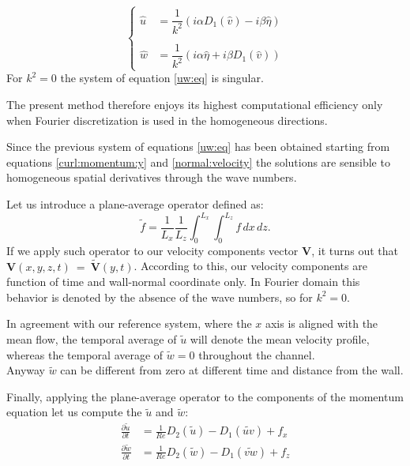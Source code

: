 \begin{equation}
\begin{cases}
\label{uw:eq}
\hat{u} &= \dfrac{1}{k^{2}} ( i \alpha D_{1}(\hat{v} ) - i \beta \hat{\eta})\\\\
\hat{w} &= \dfrac{1}{k^{2}} (i \alpha \hat{\eta} + i \beta D_{1}(\hat{v}))
\end{cases}
\end{equation}
For $k^{2}=0$ the system of equation \eqref{uw:eq} is singular. \par
The present method therefore enjoys its highest computational efficiency only when Fourier discretization is used in the homogeneous directions.
\par
Since the previous system of equations \eqref{uw:eq} has been obtained starting from equations \eqref{curl:momentum:y} and \eqref{normal:velocity} the solutions are sensible to homogeneous spatial derivatives through the wave numbers. \par
Let us introduce a plane-average operator defined as:
\begin{equation}
\tilde{f} = \frac{1}{L_{x}} \frac{1}{L_{z}} \int_{0}^{L_{x}} \int_{0}^{L_{z}} f \,dx \,dz.
\end{equation}
If we apply such operator to our velocity components vector $\mathbf{V}$, it turns out that $\mathbf{V}(x,y,z,t)~=~\mathbf{\widetilde{V}}(y,t) $. According to this, our velocity components are function of time and wall-normal coordinate only. In Fourier domain this behavior is denoted by the absence of the wave numbers, so for $k^{2}=0$. \par

In agreement with our reference system, where the $x$ axis is aligned with the mean flow, the temporal average of $\tilde{u}$ will denote the mean velocity profile, whereas the temporal average of $\tilde{w}=0$ throughout the channel. \\
Anyway $\tilde{w}$ can be different from zero at different time and distance from the wall. \par

Finally, applying the plane-average operator to the components of the momentum equation let us compute the $\tilde{u}$ and $\tilde{w}$:
\begin{subequations}
\begin{align}
\frac{\partial{ \tilde{u}}}{\partial t} &=  \frac{1}{Re} D_{2} ( \tilde{u}) - D_{1}( \widetilde{uv}) + f_{x} \\
\frac{\partial{ \tilde{w}}}{\partial t} &= \frac{1}{Re} D_{2}( \tilde{w}) - D_{1} ( \widetilde{vw}) + f_{z}
\end{align}
\end{subequations}

